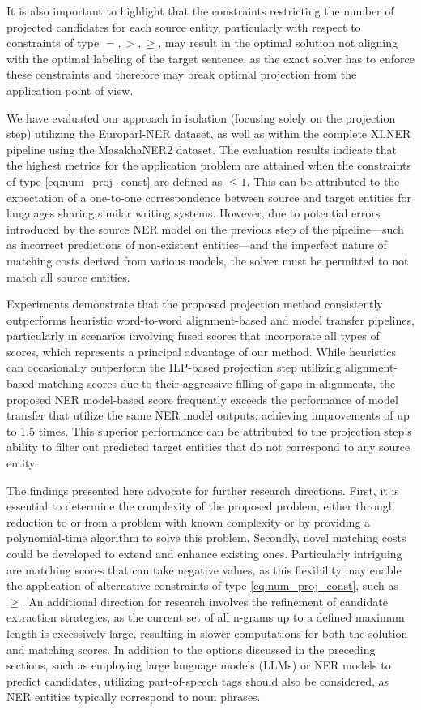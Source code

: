 It is also important to highlight that the constraints restricting the number of projected candidates
for each source entity, particularly with respect to constraints of type \( =, >, \geq \), may result
in the optimal solution not aligning with the optimal labeling of the target sentence, as the
exact solver has to enforce these constraints and therefore may break optimal projection from the application
point of view.

We have evaluated our approach in isolation (focusing solely on the projection step) utilizing the
Europarl-NER dataset, as well as within the complete XLNER pipeline using the MasakhaNER2 dataset.
The evaluation results indicate that the highest metrics for the application problem are attained when
the constraints of type \eqref{eq:num_proj_const} are defined as \( \leq 1 \). This can be attributed
to the expectation of a one-to-one correspondence between source and target entities for languages
sharing similar writing systems. However, due to potential errors introduced by the source NER
model on the previous step of the pipeline—such as incorrect predictions of non-existent entities—and
the imperfect nature of matching costs derived from various models, the solver must be permitted to
not match all source entities.

Experiments demonstrate that the proposed projection method consistently outperforms
heuristic word-to-word alignment-based and model transfer pipelines, particularly in scenarios
involving fused scores that incorporate all types of scores, which represents a principal advantage
of our method. While heuristics can occasionally outperform the ILP-based projection step utilizing
alignment-based matching scores due to their aggressive filling of gaps in alignments, the proposed
NER model-based score frequently exceeds the performance of model transfer that utilize the
same NER model outputs, achieving improvements of up to 1.5 times. This superior performance can be
attributed to the projection step's ability to filter out predicted target entities that do not
correspond to any source entity.

The findings presented here advocate for further research directions.
First, it is essential to determine the complexity of the proposed problem, either through
reduction to or from a problem with known complexity or by providing a polynomial-time algorithm to solve this problem.
Secondly, novel matching costs could be developed to extend and enhance existing ones. Particularly
intriguing are matching scores that can take negative values, as this flexibility may enable the
application of alternative constraints of type \eqref{eq:num_proj_const}, such as \( \geq \).
An additional direction for research involves the refinement of candidate extraction strategies,
as the current set of all n-grams up to a defined maximum length is excessively large, resulting
in slower computations for both the solution and matching scores. In addition to the options
discussed in the preceding sections, such as employing large language models (LLMs) or NER models
to predict candidates, utilizing part-of-speech tags should also be considered, as NER entities
typically correspond to noun phrases.

